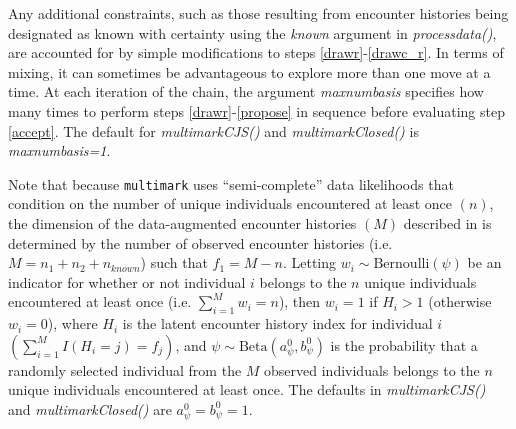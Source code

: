 \documentclass[12pt]{article}
\begin{document}
Any additional constraints, such as those resulting from encounter histories being designated as known with certainty using the \textit{known} argument in \textit{processdata()}, are accounted for by simple modifications to steps \ref{drawr}-\ref{drawc_r}. In terms of mixing, it can sometimes be advantageous to explore more than one move at a time. At each iteration of the chain, the argument \textit{maxnumbasis} specifies how many times to perform steps \ref{drawr}-\ref{propose} in sequence before evaluating step \ref{accept}. The default for \textit{multimarkCJS()} and \textit{multimarkClosed()} is \textit{maxnumbasis=1}.

Note that because \verb|multimark| uses ``semi-complete'' data likelihoods that condition on the number of unique individuals encountered at least once $(n)$, the dimension of the data-augmented encounter histories $(M)$ described in \cite{McClintockEtAl2014} is determined by the number of observed encounter histories (i.e. $M=n_1+n_2+n_{known}$) such that $f_1=M-n$. Letting $w_i \sim \text{Bernoulli} \left(\psi\right)$ be an indicator for whether or not individual $i$ belongs to the $n$ unique individuals encountered at least once (i.e. $\sum_{i=1}^M w_i = n$), then $w_i=1$ if $H_i>1$ (otherwise $w_i=0$), where $H_i$ is the latent encounter history index for individual $i$ $\left(\sum_{i=1}^M I(H_i=j) = f_j\right)$, and $\psi \sim \text{Beta}\left(a^0_\psi,b^0_\psi\right)$ is the probability that a randomly selected individual from the $M$ observed individuals belongs to the $n$ unique individuals encountered at least once. The defaults in \textit{multimarkCJS()} and \textit{multimarkClosed()} are $a^0_\psi=b^0_\psi=1$.



\end{document}
